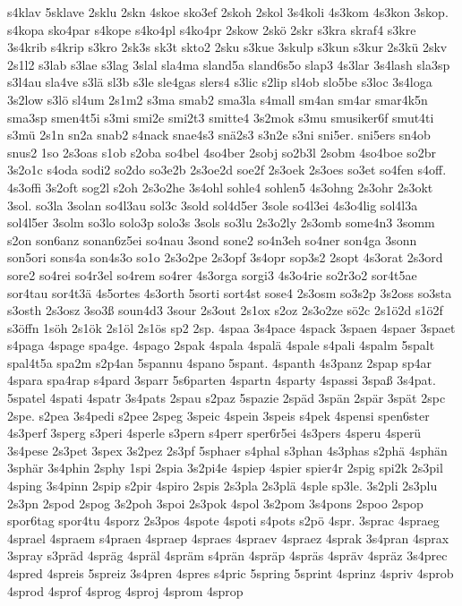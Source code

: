 {s4klav
5sklave
2sklu
2skn
4skoe
sko3ef
2skoh
2skol
3s4koli
4s3kom
4s3kon
3skop.
s4kopa
sko4par
s4kope
s4ko4pl
s4ko4pr
2skow
2skö
2skr
s3kra
skraf4
s3kre
3s4krib
s4krip
s3kro
2sk3s
sk3t
skto2
2sku
s3kue
3skulp
s3kun
s3kur
2s3kü
2skv
2s1l2
s3lab
s3lae
s3lag
3slal
sla4ma
sland5a
sland6s5o
slap3
4s3lar
3s4lash
sla3sp
s3l4au
sla4ve
s3lä
sl3b
s3le
sle4gas
slers4
s3lic
s2lip
sl4ob
slo5be
s3loc
3s4loga
3s2low
s3lö
sl4um
2s1m2
s3ma
smab2
sma3la
s4mall
sm4an
sm4ar
smar4k5n
sma3sp
smen4t5i
s3mi
smi2e
smi2t3
smitte4
3s2mok
s3mu
smusiker6f
smut4ti
s3mü
2s1n
sn2a
snab2
s4nack
snae4s3
snä2s3
s3n2e
s3ni
sni5er.
sni5ers
sn4ob
snus2
1so
2s3oas
s1ob
s2oba
so4bel
4so4ber
2sobj
so2b3l
2sobm
4so4boe
so2br
3s2o1c
s4oda
sodi2
so2do
so3e2b
2s3oe2d
soe2f
2s3oek
2s3oes
so3et
so4fen
s4off.
4s3offi
3s2oft
sog2l
s2oh
2s3o2he
3s4ohl
sohle4
sohlen5
4s3ohng
2s3ohr
2s3okt
3sol.
so3la
3solan
so4l3au
sol3c
3sold
sol4d5er
3sole
so4l3ei
4s3o4lig
sol4l3a
sol4l5er
3solm
so3lo
solo3p
solo3s
3sols
so3lu
2s3o2ly
2s3omb
some4n3
3somm
s2on
son6anz
sonan6z5ei
so4nau
3sond
sone2
so4n3eh
so4ner
son4ga
3sonn
son5ori
sons4a
son4s3o
so1o
2s3o2pe
2s3opf
3s4opr
sop3s2
2sopt
4s3orat
2s3ord
sore2
so4rei
so4r3el
so4rem
so4rer
4s3orga
sorgi3
4s3o4rie
so2r3o2
sor4t5ae
sor4tau
sor4t3ä
4s5ortes
4s3orth
5sorti
sort4st
sose4
2s3osm
so3s2p
3s2oss
so3sta
s3osth
2s3osz
3so3ß
soun4d3
3sour
2s3out
2s1ox
s2oz
2s3o2ze
sö2c
2s1ö2d
s1ö2f
s3öffn
1söh
2s1ök
2s1öl
2s1ös
sp2
2sp.
4spaa
3s4pace
4spack
3spaen
4spaer
3spaet
s4paga
4spage
spa4ge.
4spago
2spak
4spala
4spalä
4spale
s4pali
4spalm
5spalt
spal4t5a
spa2m
s2p4an
5spannu
4spano
5spant.
4spanth
4s3panz
2spap
sp4ar
4spara
spa4rap
s4pard
3sparr
5s6parten
4spartn
4sparty
4spassi
3spaß
3s4pat.
5spatel
4spati
4spatr
3s4pats
2spau
s2paz
5spazie
2späd
3spän
2spär
3spät
2spc
2spe.
s2pea
3s4pedi
s2pee
2speg
3speic
4spein
3speis
s4pek
4spensi
spen6ster
4s3perf
3sperg
s3peri
4sperle
s3pern
s4perr
sper6r5ei
4s3pers
4speru
4sperü
3s4pese
2s3pet
3spex
3s2pez
2s3pf
5sphaer
s4phal
s3phan
4s3phas
s2phä
4sphän
3sphär
3s4phin
2sphy
1spi
2spia
3s2pi4e
4spiep
4spier
spier4r
2spig
spi2k
2s3pil
4sping
3s4pinn
2spip
s2pir
4spiro
2spis
2s3pla
2s3plä
4sple
sp3le.
3s2pli
2s3plu
2s3pn
2spod
2spog
3s2poh
3spoi
2s3pok
4spol
3s2pom
3s4pons
2spoo
2spop
spor6tag
spor4tu
4sporz
2s3pos
4spote
4spoti
s4pots
s2pö
4spr.
3sprac
4spraeg
4sprael
4spraem
s4praen
4spraep
4spraes
4spraev
4spraez
4sprak
3s4pran
4sprax
3spray
s3präd
4spräg
4spräl
4spräm
s4prän
4spräp
4spräs
4spräv
4spräz
3s4prec
4spred
4spreis
5spreiz
3s4pren
4spres
s4pric
5spring
5sprint
4sprinz
4spriv
4sprob
4sprod
4sprof
4sprog
4sproj
4sprom
4sprop
}
